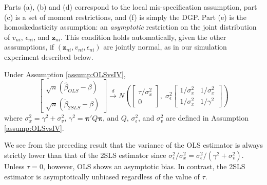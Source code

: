 Parts (a), (b) and (d) correspond to the local mis-specification assumption, part (c) is a set of moment restrictions, and (f) is simply the DGP.
Part (e) is the homoskedasticity assumption: an \emph{asymptotic} restriction on the joint distribution of $v_{ni}$, $\epsilon_{ni}$, and $\mathbf{z}_{ni}$. 
This condition holds automatically, given the other asssumptions, if $(\mathbf{z}_{ni}, v_{ni}, \epsilon_{ni})$ are jointly normal, as in our simulation experiment described below. 

\begin{thm}
	\label{thm:OLSvsIV} Under Assumption \ref{assump:OLSvsIV},
	$$
\left[
\begin{array}{c}
  \sqrt{n}(\widehat{\beta}_{OLS} - \beta) \\
  \sqrt{n}(\widetilde{\beta}_{2SLS} - \beta)
\end{array}
\right] \overset{d}{\rightarrow}
N\left(
\left[
\begin{array}{c}
\tau/\sigma_x^2 \\ 
0
\end{array}
\right],\;
\sigma_\epsilon^2 \left[ \begin{array}{cc}
  1/\sigma_x^2 & 1/\sigma_x^2\\
  1/\sigma_x^2 & 1/\gamma^2 
  \end{array}\right]
  \right)
$$
where $\sigma_x^2 = \gamma^2 + \sigma_v^2$, $\gamma^2 = \boldsymbol{\pi}'Q \boldsymbol{\pi}$, and $Q$, $ \sigma_\epsilon^2$, and $\sigma_v^2$ are defined in Assumption \ref{assump:OLSvsIV}.
\end{thm}

We see from the preceding result that the variance of the OLS estimator is always strictly lower than that of the 2SLS estimator since $\sigma^2_\epsilon/\sigma_x^2 = \sigma^2_\epsilon/(\gamma^2 + \sigma_v^2)$. 
Unless $\tau = 0$, however, OLS shows an asymptotic bias. 
In contrast, the 2SLS estimator is asymptotically unbiased regardless of the value of $\tau$.  